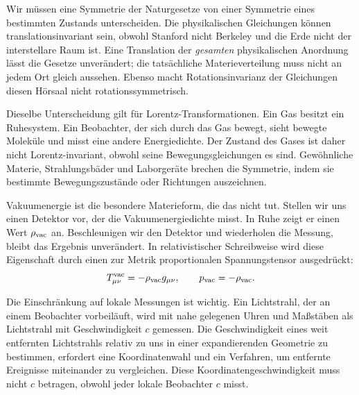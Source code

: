 Wir müssen eine Symmetrie der Naturgesetze von einer Symmetrie eines bestimmten Zustands unterscheiden. Die physikalischen Gleichungen können translationsinvariant sein, obwohl Stanford nicht Berkeley und die Erde nicht der interstellare Raum ist. Eine Translation der \emph{gesamten} physikalischen Anordnung lässt die Gesetze unverändert; die tatsächliche Materieverteilung muss nicht an jedem Ort gleich aussehen. Ebenso macht Rotationsinvarianz der Gleichungen diesen Hörsaal nicht rotationssymmetrisch.

Dieselbe Unterscheidung gilt für Lorentz-Transformationen. Ein Gas besitzt ein Ruhesystem. Ein Beobachter, der sich durch das Gas bewegt, sieht bewegte Moleküle und misst eine andere Energiedichte. Der Zustand des Gases ist daher nicht Lorentz-invariant, obwohl seine Bewegungsgleichungen es sind. Gewöhnliche Materie, Strahlungsbäder und Laborgeräte brechen die Symmetrie, indem sie bestimmte Bewegungszustände oder Richtungen auszeichnen.

Vakuumenergie ist die besondere Materieform, die das nicht tut. Stellen wir uns einen Detektor vor, der die Vakuumenergiedichte misst. In Ruhe zeigt er einen Wert \(\rho_{\rm vac}\) an. Beschleunigen wir den Detektor und wiederholen die Messung, bleibt das Ergebnis unverändert. In relativistischer Schreibweise wird diese Eigenschaft durch einen zur Metrik proportionalen Spannungstensor ausgedrückt:
\begin{equation}
T_{\mu\nu}^{\rm vac}=-\rho_{\rm vac}g_{\mu\nu},
\qquad
p_{\rm vac}=-\rho_{\rm vac}.
\label{eq:l08-vacuum-stress}
\end{equation}

Die Einschränkung auf lokale Messungen ist wichtig. Ein Lichtstrahl, der an einem Beobachter vorbeiläuft, wird mit nahe gelegenen Uhren und Maßstäben als Lichtstrahl mit Geschwindigkeit \(c\) gemessen. Die Geschwindigkeit eines weit entfernten Lichtstrahls relativ zu uns in einer expandierenden Geometrie zu bestimmen, erfordert eine Koordinatenwahl und ein Verfahren, um entfernte Ereignisse miteinander zu vergleichen. Diese Koordinatengeschwindigkeit muss nicht \(c\) betragen, obwohl jeder lokale Beobachter \(c\) misst.

\begin{classroomqa}
\end{classroomqa}


